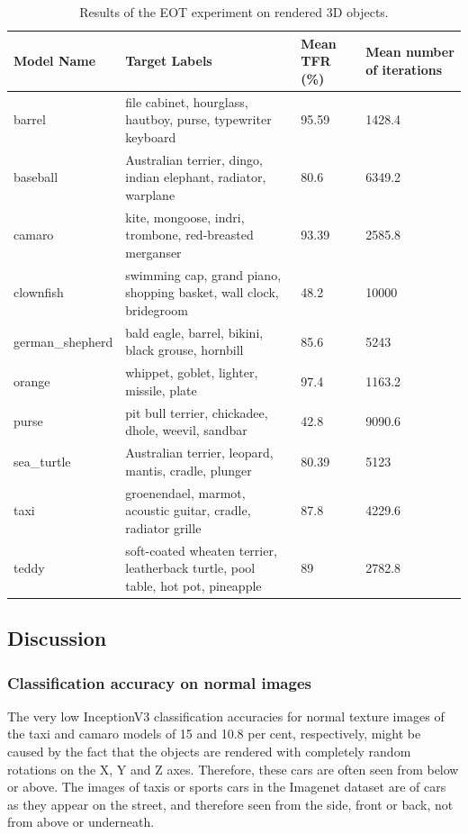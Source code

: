 \begin{table}
\caption{Results of the EOT experiment on rendered 3D objects.}
\label{table:eot_results}
\begin{tabular}{|p{2.6cm} | p{6.5cm} | p{2cm}| p{2cm}|} 
 \hline
 Model Name & Target Labels & Mean TFR (\%) & Mean number of iterations \\
 \hline
 barrel & file cabinet, hourglass, hautboy, purse, typewriter keyboard & 95.59 & 1428.4 \\ 
 \hline
 baseball & Australian terrier, dingo, indian elephant, radiator, warplane & 80.6 & 6349.2 \\
 \hline
 camaro & kite, mongoose, indri, trombone, red-breasted merganser & 93.39 & 2585.8 \\
 \hline
 clownfish & swimming cap, grand piano, shopping basket, wall clock, bridegroom & 48.2 & 10000 \\
 \hline
 german\_shepherd & bald eagle, barrel, bikini, black grouse, hornbill & 85.6 & 5243 \\
 \hline
 orange & whippet, goblet, lighter, missile, plate & 97.4 & 1163.2 \\
 \hline
 purse & pit bull terrier, chickadee, dhole, weevil, sandbar & 42.8 & 9090.6 \\
 \hline
 sea\_turtle & Australian terrier, leopard, mantis, cradle, plunger & 80.39 & 5123 \\
 \hline
 taxi & groenendael, marmot, acoustic guitar, cradle, radiator grille & 87.8 & 4229.6 \\
 \hline
 teddy & soft-coated wheaten terrier, leatherback turtle, pool table, hot pot, pineapple & 89 & 2782.8 \\
 \hline
\end{tabular}
\end{table}

\newpage
\subsection{Discussion}

\subsubsection{Classification accuracy on normal images}

The very low InceptionV3 classification accuracies for normal texture images of the taxi and camaro models of 15 and 10.8 per cent, respectively, might be caused by the fact that the objects are rendered with completely random rotations on the X, Y and Z axes. Therefore, these cars are often seen from below or above. The images of taxis or sports cars in the Imagenet dataset are of cars as they appear on the street, and therefore seen from the side, front or back, not from above or underneath.

